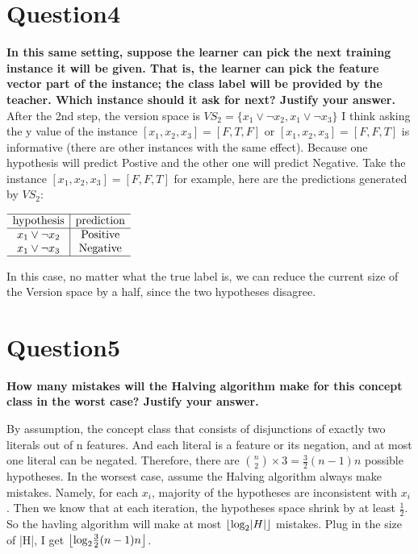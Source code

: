 \documentclass[paper=a4, fontsize=11pt]{scrartcl} %
\DeclarePairedDelimiter\floor{\lfloor}{\rfloor}
\numberwithin{equation}{section} %
\numberwithin{figure}{section} %
\numberwithin{table}{section} %
\begin{document}
\newpage
\section*{Question4}
\textbf{In this same setting, suppose the learner can pick the next training instance it will be given. That is, the learner can pick the feature vector part of the instance; the class label will be provided by the teacher. Which instance should it ask for next? Justify your answer.}
\bigbreak 
After the 2nd step, the version space is $VS_2 = 
\{
x_1 \lor \neg x_2, x_1 \lor \neg x_3
\}$
\smallbreak
I think asking the y value of the instance $[x_1,x_2,x_3] = [F,T,F]$ or $[x_1,x_2,x_3] = [F,F,T]$ is informative (there are other instances with the same effect). Because one hypothesis will predict Postive and the other one will predict Negative. 
\bigbreak
Take the instance $[x_1,x_2,x_3] = [F,F,T]$ for example, here are the predictions generated by $VS_2$: 

\begin{center}
$
\begin{array}{c|c}
\hline
\text{hypothesis} & \text{prediction} \\
\hline
x_1 \lor \neg x_2 & \text{Positive}  \\ 
x_1 \lor \neg x_3 & \text{Negative}  \\ 
\hline
\end{array}
$
\end{center}

In this case, no matter what the true label is, we can reduce the current size of the Version space by a half, since the two hypotheses disagree.  

\newpage
\section*{Question5}
\textbf{How many mistakes will the Halving algorithm make for this concept class in the worst case? Justify your answer.}
\bigbreak 


By assumption, the concept class that consists of disjunctions of exactly two literals out of n features. And each literal is a feature or its negation, and at most one literal can be negated. Therefore, there are 
$
{{n}\choose{2}} \times 3 = \frac{3}{2}(n-1)n
$
possible hypotheses. 
\smallbreak
In the worsest case, assume the Halving algorithm always make mistakes. Namely, for each $x_i$, majority of the hypotheses are inconsistent with $x_i$. Then we know that at each iteration, the hypotheses space shrink by at least $\frac{1}{2}$. So the havling algorithm will make at most  $\floor*{\text{log}_2 |H|}$ mistakes. Plug in the size of |H|, I get $\floor*{\text{log}_2 \frac{3}{2}(n-1)n}$. 
\bigbreak
\end{document}
